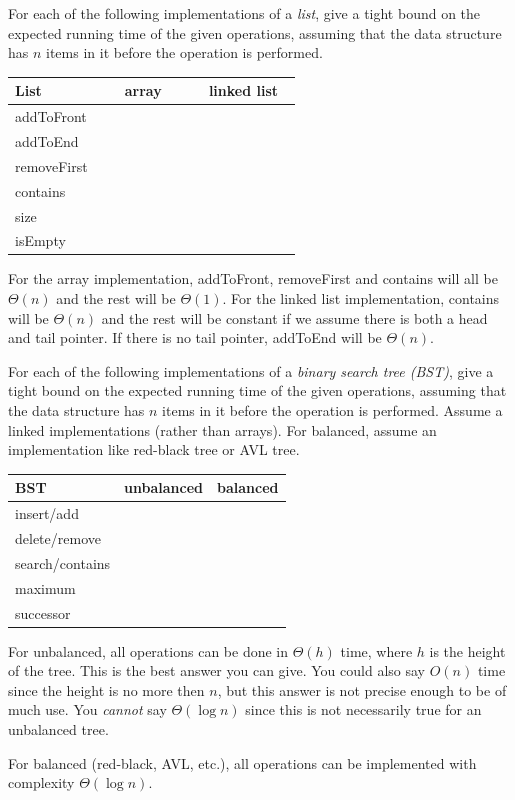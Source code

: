 \begin{exer}
For each of the following implementations of a {\em list}, 
give a tight bound
on the expected running time of the given operations, 
assuming that the data structure has $n$ items in it before the operation is performed.

\noindent
{\LARGE
\begin{tabular}{|l|l|l|}
\hline
{\bf List}&\, \, \,  array\, \, \, &\, \, linked list\, \,\\
\hline
\hline
addToFront&&\\
\hline
addToEnd&&\\
\hline
removeFirst&&\\
\hline
contains&&\\
\hline
size&&\\
\hline
isEmpty&&\\
\hline
\end{tabular}
}
\begin{answer}
For the array implementation, addToFront, removeFirst and contains will all be $\Theta(n)$
and the rest will be $\Theta(1)$.
For the linked list implementation, contains will be $\Theta(n)$ and the rest will be 
constant if we assume there is both a head and tail pointer.  If there is no tail pointer,
addToEnd will be $\Theta(n)$.
\end{answer}
\end{exer}

\begin{exer}
For each of the following implementations of a {\em binary search tree (BST)}, 
give a tight bound
on the expected running time of the given operations, 
assuming that the data structure has $n$ items in it before the operation is performed.
Assume a linked implementations (rather than arrays). 
For balanced, assume an implementation like red-black tree or AVL tree.

\noindent
{\LARGE
\begin{tabular}{|l|l|l|}
\hline
{\bf BST}&unbalanced&balanced\\
\hline
\hline
insert/add&&\\
\hline
delete/remove&&\\
\hline
search/contains&&\\
\hline
maximum&&\\
\hline
successor&&\\
\hline
\end{tabular}
}
\begin{answer}
For unbalanced, all operations can be done in $\Theta(h)$ time, where $h$ is the height 
of the tree.  This is the best answer you can give.  You could also say $O(n)$ time since
the height is no more then $n$, but this answer is not precise enough to be of much use.
You {\em cannot} say $\Theta(\log n)$ since 
this is not necessarily true for an unbalanced tree.

For balanced (red-black, AVL, etc.), all operations can be implemented with complexity $\Theta(\log n)$.
\end{answer}
\end{exer}


